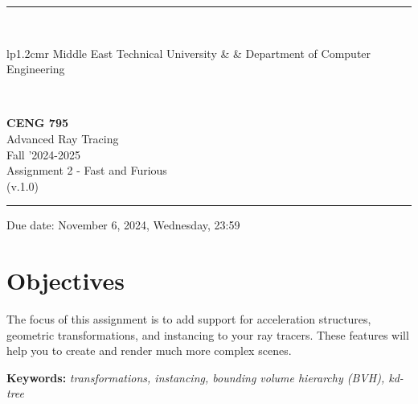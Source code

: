 \documentclass[12pt]{article}
\newcommand{\HRule}{\rule{\linewidth}{1mm}}
\begin{document}
\noindent \HRule \\[3mm]
\small
\begin{tabular}[b]{lp{1.2cm}r}
\href{https://www.metu.edu.tr/}{} Middle East Technical
University &  &
\href{https://ceng.metu.edu.tr/information}{} Department of Computer Engineering \\
\end{tabular} \\
\begin{center}

                 \LARGE \textbf{CENG 795} \\[4mm]
                 \Large Advanced Ray Tracing \\[4mm]
                \normalsize Fall '2024-2025 \\
                    \normalsize Assignment 2 - Fast and Furious \\
                    \normalsize (v.1.0)
\end{center}
\HRule

\begin{center}
Due date: November 6, 2024, Wednesday, 23:59
\end{center}


\section{Objectives}
The focus of this assignment is to add support for acceleration
structures, geometric transformations, and instancing to your ray
tracers. These features will help you to create and render much more
complex scenes.

\vspace{0.5cm} \noindent \textbf{Keywords:} \emph{transformations,
    instancing, bounding volume hierarchy (BVH), kd-tree}
\end{document}
